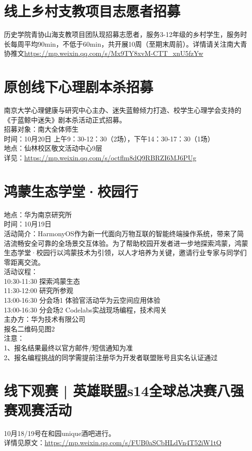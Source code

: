 \documentclass[letterpaper, 12pt]{article}
\begin{document}
\begin{multicols}{2}
\section{线上乡村支教项目志愿者招募}
历史学院青协山海支教项目团队现招募志愿者，服务3-12年级的乡村学生，服务时长每周平均90min，不低于60min，共开展10周（至期末周前）。详情请关注南大青协推文\url{https://mp.weixin.qq.com/s/Mx9TY8xvM-CTT_xnU5fzYw}
\section{原创线下心理剧本杀招募}
南京大学心理健康与研究中心主办、迷失蓝鲸倾力打造、校学生心理学会支持的《于蓝鲸中迷失》剧本杀活动正式招募。\\
招募对象：南大全体师生\\
时间：10月20日 上午9：30-12：30（2场），下午14：30-17：30（1场）\\
地点：仙林校区敬文活动中心9层\\
详见：\url{https://mp.weixin.qq.com/s/octflm8dQ9RBRZI6MJ6PUg}
\section{鸿蒙生态学堂·校园行}
地点：华为南京研究所\\
时间：10月19日\\
活动简介：HarmonyOS作为新一代面向万物互联的智能终端操作系统，带来了简洁流畅安全可靠的全场景交互体验。为了帮助校园开发者进一步地探索鸿蒙，鸿蒙生态学堂·校园行以鸿蒙技术为引领，以人才培养为关键，邀请行业专家与同学们零距离交流。\\
活动议程：\\
10:30-11:30 探索鸿蒙生态\\
11:30-12:00 研究所参观\\
13:00-16:30 分会场1 体验官活动华为云空间应用体验\\
13:00-16:30 分会场2 Codelabs实战现场编程，技术闯关\\
主办方：华为技术有限公司\\
报名二维码见图2\\
注意：\\
1、报名结果最终以官方邮件/短信通知为准\\2、报名编程挑战的同学需提前注册华为开发者联盟账号且实名认证通过\\

\section{线下观赛 | 英雄联盟s14全球总决赛八强赛观赛活动}
10月18/19号在和园unique酒吧进行。\\
详情见原文：\url{https://mp.weixin.qq.com/s/FUB0aSCbHLdVn4T52iW1tQ}


\end{multicols}
\end{document}
